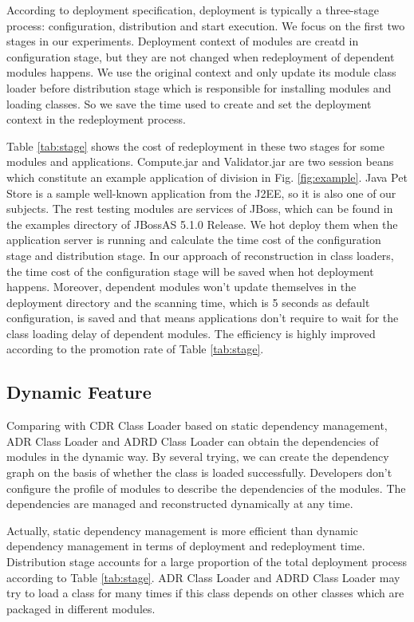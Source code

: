 \documentclass[conference]{IEEEtran}
\begin{document}
According to deployment specification\cite{jsr88}, deployment is typically a three-stage process: configuration, distribution and start execution.
We focus on the first two stages in our experiments.
Deployment context of modules are creatd in configuration stage, but they are not changed when redeployment of dependent modules happens.
We use the original context and only update its module class loader before distribution stage which is responsible for installing modules and loading classes.
So we save the time used to create and set the deployment context in the redeployment process.

Table \ref{tab:stage} shows the cost of redeployment in these two stages for some modules and applications.
Compute.jar and Validator.jar are two session beans which constitute an example application of division in Fig. \ref{fig:example}.
Java Pet Store\cite{java_pet_store} is a sample well-known application from the J2EE, so it is also one of our subjects.
The rest testing modules are services of JBoss, which can be found in the examples directory of JBossAS 5.1.0 Release.
We hot deploy them when the application server is running and calculate the time cost of the configuration stage and distribution stage.
In our approach of reconstruction in class loaders, the time cost of the configuration stage will be saved when hot deployment happens.
Moreover, dependent modules won't update themselves in the deployment directory and the scanning time, which is 5 seconds as default configuration, is saved and that means applications don't require to wait for the class loading delay of dependent modules. 
The efficiency is highly improved according to the promotion rate of Table \ref{tab:stage}.

\subsection{Dynamic Feature}
Comparing with CDR Class Loader based on static dependency management, ADR Class Loader and ADRD Class Loader can obtain the dependencies of modules in the dynamic way.
By several trying, we can create the dependency graph on the basis of whether the class is loaded successfully.
Developers don't configure the profile of modules to describe the dependencies of the modules.
The dependencies are managed and reconstructed dynamically at any time.

Actually, static dependency management is more efficient than dynamic dependency management in terms of deployment and redeployment time.
Distribution stage accounts for a large proportion of the total deployment process according to Table \ref{tab:stage}.
ADR Class Loader and ADRD Class Loader may try to load a class for many times if this class depends on other classes which are packaged in different modules.
\end{document}
